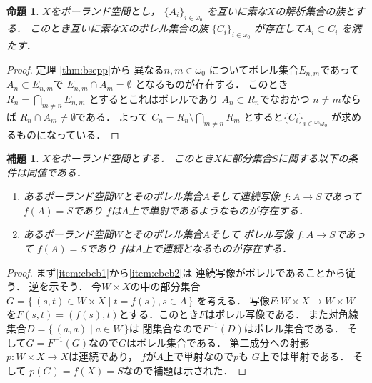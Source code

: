 \documentclass[leqno, 12pt]{jsarticle}
\newtheorem{prop}[thm]{命題}
\newtheorem{lem}[thm]{補題}
\newcommand{\myomega}{\omega_{0}}
\newcommand{\mybaire}{{}^{\myomega}\myomega}
\begin{document}
\begin{prop}\label{prop:bsep2}
$X$をポーランド空間とし，
$\{A_{i}\}_{i\in \myomega}$
を互いに素な$X$の解析集合の族とする．
このとき互いに素な$X$のボレル集合の族
$\{C_{i}\}_{i\in \myomega}$
が存在して$A_{i}\subset C_{i}$
を満たす．
\end{prop}
\begin{proof}
定理 \ref{thm:bsepp}から
異なる$n, m\in \myomega$
についてボレル集合$E_{n, m}$であって
$A_{n}\subset E_{n, m}$で
$E_{n, m}\cap A_{m}=\emptyset$
となるものが存在する．
このとき
$R_{n}=\bigcap_{m\neq n}E_{n, m}$
とするとこれはボレルであり
$A_{n}\subset R_{n}$でなおかつ
$n\neq m$ならば
$R_{n}\cap A_{m}\neq \emptyset$である．
よって
$C_{n}=R_{n}\setminus \bigcap_{m\neq n}R_{m}$
とすると$\{C_{i}\}_{i\in \mybaire}$
が求めるものになっている．
\end{proof}

\begin{lem}\label{lem:injcb}
$X$をポーランド空間とする．
このとき$X$に部分集合$S$に関する以下の条件は同値である．
\begin{enumerate}[label=\textup{(\arabic*)}]
\item\label{item:cbcb1}
あるポーランド空間$W$とそのボレル集合$A$そして連続写像
$f\colon A\to S$であって$f(A)=S$であり
$f$は$A$上で単射であるようなものが存在する．
\item\label{item:cbcb2}
あるポーランド空間$W$とそのボレル集合$A$そして
ボレル写像
$f\colon A\to S$であって
$f(A)=S$であり
$f$は$A$上で連続となるものが存在する．

\end{enumerate}
\end{lem}
\begin{proof}
まず\ref{item:cbcb1}から\ref{item:cbcb2}は
連続写像がボレルであることから従う．
逆を示そう．
今$W\times X$の中の部分集合
$G=\{\, (s, t)\in W\times X\mid t=f(s), s\in A\, \}$
を考える．
写像$F\colon W\times X\to W\times W$
を$F(s, t)=(f(s), t)$とする．このとき$F$はボレル写像である．
また対角線集合$D=\{\, (a, a)\mid a\in W\, \}$は
閉集合なので$F^{-1}(D)$はボレル集合である．
そして$G=F^{-1}(G)$なので$G$はボレル集合である．
第二成分への射影$p\colon W\times X\to X$は連続であり，
$f$が$A$上で単射なので$p$も
$G$上では単射である．
そして
$p(G)=f(X)=S$なので補題は示された．
\end{proof}
\end{document}

